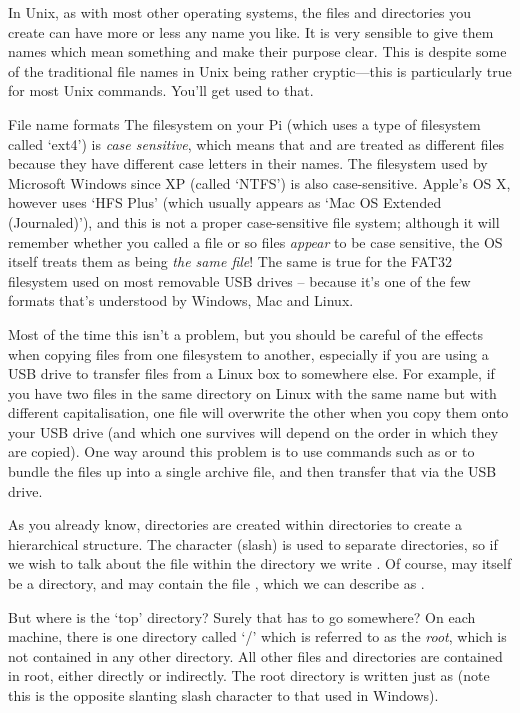 In Unix, as with most other operating systems, the files and directories you create can have more or less any name you like. It is very sensible to give them names which mean something and make their purpose clear. This is despite some of the traditional file names in Unix being rather cryptic---this is particularly true for most Unix commands. You'll get used to that.

\begin{danger}{File name formats}
The filesystem on your Pi (which uses a type of filesystem called `ext4') is \textit{case sensitive}, which means that  and  are treated as different files because they have different case letters in their names. The filesystem used by Microsoft Windows since XP (called `NTFS') is also case-sensitive. Apple's OS X, however uses `HFS Plus' (which usually appears as `Mac OS Extended (Journaled)'), and this is not a proper case-sensitive file system; although it will remember whether you called a file  or  so files \textit{appear} to be case sensitive, the OS itself treats them as being \textit{the same file}! The same is true for the FAT32 filesystem used on most removable USB drives -- because it's one of the few formats that's understood by Windows, Mac and Linux.

Most of the time this isn't a problem, but you should be careful of the effects when copying files from one filesystem to another, especially if you are using a USB drive to transfer files from a Linux box to somewhere else. For example, if you have two files in the same directory on Linux with the same name but with different capitalisation, one file will overwrite the other when you copy them onto your USB drive (and which one survives will depend on the order in which they are copied). One way around this problem is to use commands such as   or  to bundle the files up into a single archive file, and then transfer that via the USB drive.
\end{danger}

As you already know, directories are created within directories to create a hierarchical structure. The character \ttout{/} (slash) is used to separate directories, so if we wish to talk about the file  within the directory  we write . Of course,  may itself be a directory, and may contain the file , which we can describe as .

But where is the `top' directory? Surely that has to go somewhere? On each machine, there is one directory called `/' which is referred to as the \textit{root}, which is not contained in any other directory. All other files and directories are contained in root, either directly or indirectly. The root directory is written just as \fname{/} (note this is the opposite slanting slash character to that used in Windows).


